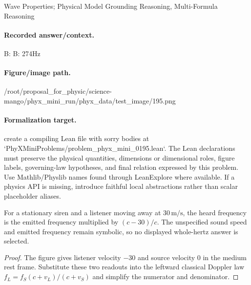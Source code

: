 Wave Properties; Physical Model Grounding Reasoning, Multi-Formula Reasoning

\paragraph{Recorded answer/context.}
B: B: 274Hz

\paragraph{Figure/image path.}
/root/proposal\_for\_physic/science-mango/phyx\_mini\_run/phyx\_data/test\_image/195.png

\paragraph{Formalization target.}
create a compiling Lean file with sorry bodies at `PhyXMiniProblems/problem\_phyx\_mini\_0195.lean`. The Lean declarations must preserve the physical quantities, dimensions or dimensional roles, figure labels, governing-law hypotheses, and final relation expressed by this problem.
Use Mathlib/Physlib names found through LeanExplore where available. If a physics API is missing, introduce faithful local abstractions rather than scalar placeholder aliases.

\begin{theorem}
\label{thm:physics:phyx_mini_0195:target}
For a stationary siren and a listener moving away at $30\,\mathrm{m/s}$, the heard frequency is the emitted frequency multiplied by $(c-30)/c$.  The unspecified sound speed and emitted frequency remain symbolic, so no displayed whole-hertz answer is selected.
\end{theorem}
\begin{proof}
The figure gives listener velocity $-30$ and source velocity $0$ in the medium rest frame.  Substitute these two readouts into the leftward classical Doppler law $f_L=f_S(c+v_L)/(c+v_S)$ and simplify the numerator and denominator.
\end{proof}

